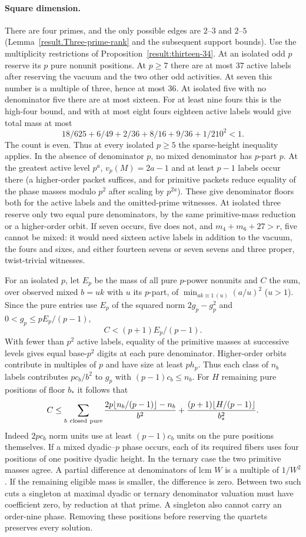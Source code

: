 \documentclass[11pt]{amsart}
\numberwithin{equation}{section}
\theoremstyle{definition}
\theoremstyle{plain}
\begin{document}
\paragraph{Square dimension.}
There are four primes, and the only possible edges are $2$--$3$ and
$2$--$5$ (Lemma~\ref{result.Three-prime-rank} and the subsequent support
bounds). Use the multiplicity restrictions of Proposition~\ref{result:thirteen-34}. At an isolated odd $p$ reserve its $p$
pure nonunit positions. At $p\ge7$ there are at most $37$ active labels
after reserving the vacuum and the two other odd activities. At seven
this number is a multiple of three, hence at most $36$. At isolated
five with no denominator five there are at most sixteen. For at least
nine fours this is the high-four bound, and with at most eight fours
eighteen active labels would give total mass at most
\[
 18/625+6/49+2/36+8/16+9/36+1/210^2<1 .
\]
The count is even. Thus at every isolated $p\ge5$ the sparse-height
inequality applies. In the absence of denominator $p$, no mixed
denominator has $p$-part $p$.
At the greatest active level $p^a$, $v_p(M)=2a-1$ and at least
$p-1$ labels occur there (a higher-order packet suffices, and for
primitive packets reduce equality of the phase masses modulo $p^2$
after scaling by $p^{2a}$). These give denominator floors both for
the active labels and the omitted-prime witnesses. At isolated three reserve only two equal pure denominators, by the same
primitive-mass reduction or a higher-order orbit.
If seven occurs, five does not, and $m_4+m_6+27>r$, five cannot be
mixed: it would need sixteen active labels in addition to the vacuum,
the fours and sixes, and either fourteen sevens or seven sevens and
three proper, twist-trivial witnesses.

For an isolated $p$, let $E_p$ be the mass of all pure $p$-power
nonunits and $C$ the sum, over observed mixed $b=uk$ with $u$ its
$p$-part, of $\min_{ak\equiv1\, (u)}(a/u)^2$ ($u>1$). Since the pure
entries use $E_p$ of the squared norm $2g_p-g_p^2$ and
$0<g_p\le pE_p/(p-1)$,
\[
 C<(p+1)E_p/(p-1).
\]
With fewer than $p^2$ active labels, equality of the primitive masses
at successive levels gives equal base-$p^2$ digits at each pure
denominator. Higher-order orbits contribute in multiples of $p$
and have size at least $ph_p$. Thus each class of $n_b$ labels contributes
$pc_b/b^2$ to $g_p$ with $(p-1)c_b\le n_b$. For $H$ remaining
pure positions of floor $b_*$ it follows that
\[
 C\le\sum_{b\ {\rm closed\ pure}}
 \frac{2p\lfloor n_b/(p-1)\rfloor-n_b}{b^2}
 +\frac{(p+1)\lfloor H/(p-1)\rfloor}{b_*^2}.
\]
Indeed $2pc_b$ norm units use at least $(p-1)c_b$ units on the pure
positions themselves. If a mixed dyadic--$p$ phase occurs,
each of its required fibers uses four positions of one positive dyadic
height. In the ternary case the two primitive masses agree. A partial
difference at denominators of lcm $W$ is a multiple of $1/W^2$. If the
remaining eligible mass is smaller, the difference is zero.
Between two such cuts a singleton at maximal dyadic or ternary
denominator valuation must have coefficient zero, by reduction at that
prime. A singleton also cannot carry an order-nine phase. Removing these
positions before reserving the quartets preserves every solution.
\end{document}
